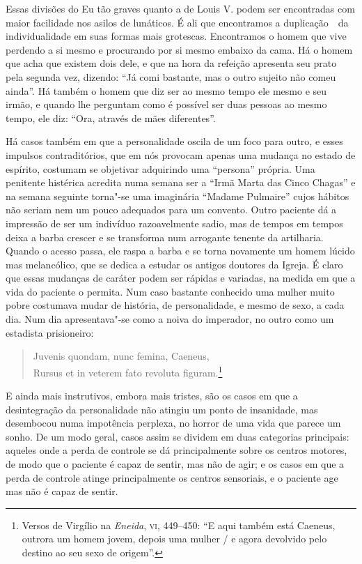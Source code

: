 Essas divisões do Eu tão graves quanto a de Louis V. podem ser
encontradas com maior facilidade nos asilos de lunáticos. É ali que
encontramos a duplicação\ \ da individualidade em suas formas mais
grotescas.  Encontramos o homem que vive perdendo a si mesmo e
procurando por si mesmo embaixo da cama.  Há o homem que acha que
existem dois dele, e que na hora da refeição apresenta seu prato pela
segunda vez, dizendo: “Já comi bastante, mas o outro sujeito não comeu
ainda”.  Há também o homem que diz ser ao mesmo tempo ele mesmo e seu
irmão, e quando lhe perguntam como é possível ser duas pessoas ao mesmo
tempo, ele diz: “Ora, através de mães diferentes”.

Há casos também em que a personalidade oscila de um foco para outro, e
esses impulsos contraditórios, que em nós provocam apenas uma mudança
no estado de espírito, costumam se objetivar adquirindo uma “persona”
própria.  Uma penitente histérica acredita numa semana ser a “Irmã
Marta das Cinco Chagas” e na semana seguinte torna"-se uma imaginária
“Madame Pulmaire” cujos hábitos não seriam nem um pouco adequados para
um convento.  Outro paciente dá a impressão de ser um indivíduo
razoavelmente sadio, mas de tempos em tempos deixa a barba crescer e se
transforma num arrogante tenente da artilharia. Quando o acesso passa,
ele raspa a barba e se torna novamente um homem lúcido mas melancólico,
que se dedica a estudar os antigos doutores da Igreja. É claro que
essas mudanças de caráter podem ser rápidas e variadas, na medida em
que a vida do paciente o permita.  Num caso bastante conhecido uma
mulher muito pobre costumava mudar de história, de personalidade, e
mesmo de sexo, a cada dia.  Num dia apresentava"-se como a noiva do
imperador, no outro como um estadista prisioneiro:

\begin{quote}
Juvenis quondam, nunc femina, Caeneus,\\
Rursus et in veterem fato revoluta figuram.\footnote{
Versos de Virgílio na \textit{Eneida}, \textsc{vi}, 449--450: “E aqui também
está Caeneus, outrora um homem jovem, depois uma mulher / e agora
devolvido pelo destino ao seu sexo de origem”.}
\end{quote}

E ainda mais instrutivos, embora mais tristes, são os casos em que a
desintegração da personalidade não atingiu um ponto de insanidade, mas
desembocou numa impotência perplexa, no horror de uma vida que parece
um sonho.  De um modo geral, casos assim se dividem em duas categorias
principais: aqueles onde a perda de controle se dá principalmente sobre
os centros motores, de modo que o paciente é capaz de sentir, mas não
de agir; e os casos em que a perda de controle atinge principalmente os
centros sensoriais, e o paciente age mas não é capaz de sentir.

